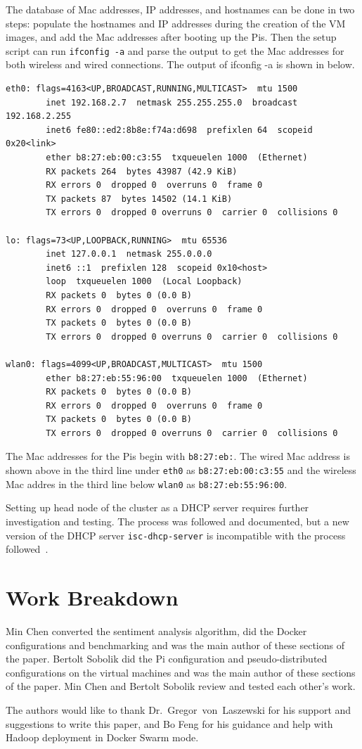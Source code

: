 The database of Mac addresses, IP addresses, and hostnames can be done
in two steps: populate the hostnames and IP addresses during the
creation of the VM images, and add the Mac addresses after booting up
the Pis. Then the setup script can run \verb|ifconfig -a| and parse
the output to get the Mac addresses for both wireless and wired
connections. The output of ifconfig -a is shown in below.
\begin{verbatim} 
eth0: flags=4163<UP,BROADCAST,RUNNING,MULTICAST>  mtu 1500
        inet 192.168.2.7  netmask 255.255.255.0  broadcast 192.168.2.255
        inet6 fe80::ed2:8b8e:f74a:d698  prefixlen 64  scopeid 0x20<link>
        ether b8:27:eb:00:c3:55  txqueuelen 1000  (Ethernet)
        RX packets 264  bytes 43987 (42.9 KiB)
        RX errors 0  dropped 0  overruns 0  frame 0
        TX packets 87  bytes 14502 (14.1 KiB)
        TX errors 0  dropped 0 overruns 0  carrier 0  collisions 0

lo: flags=73<UP,LOOPBACK,RUNNING>  mtu 65536
        inet 127.0.0.1  netmask 255.0.0.0
        inet6 ::1  prefixlen 128  scopeid 0x10<host>
        loop  txqueuelen 1000  (Local Loopback)
        RX packets 0  bytes 0 (0.0 B)
        RX errors 0  dropped 0  overruns 0  frame 0
        TX packets 0  bytes 0 (0.0 B)
        TX errors 0  dropped 0 overruns 0  carrier 0  collisions 0

wlan0: flags=4099<UP,BROADCAST,MULTICAST>  mtu 1500
        ether b8:27:eb:55:96:00  txqueuelen 1000  (Ethernet)
        RX packets 0  bytes 0 (0.0 B)
        RX errors 0  dropped 0  overruns 0  frame 0
        TX packets 0  bytes 0 (0.0 B)
        TX errors 0  dropped 0 overruns 0  carrier 0  collisions 0
\end{verbatim}

The Mac addresses for the Pis begin with \verb|b8:27:eb:|. The wired
Mac address is shown above in the third line under \verb|eth0|
as \verb|b8:27:eb:00:c3:55| and the wireless Mac addres in the third
line below \verb|wlan0| as \verb|b8:27:eb:55:96:00|.

Setting up head node of the cluster as a DHCP server requires further
investigation and testing. The process was followed and documented,
but a new version of the DHCP server \verb|isc-dhcp-server| is
incompatible with the process followed~\cite{hid-sp18-419-pi-DHCP}.

\section{Work Breakdown}
Min Chen converted the sentiment analysis algorithm, did the Docker
configurations and benchmarking and was the main author of these
sections of the paper. Bertolt Sobolik did the Pi configuration and
pseudo-distributed configurations on the virtual machines and was the
main author of these sections of the paper. Min Chen and Bertolt
Sobolik review and tested each other's work.

\begin{acks}

  The authors would like to thank Dr.~Gregor~von~Laszewski for his
  support and suggestions to write this paper, and Bo Feng for his guidance 
  and help with Hadoop deployment in Docker Swarm mode.

\end{acks}



